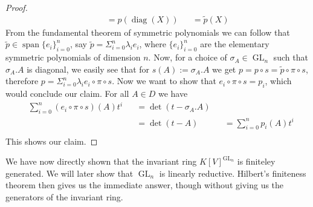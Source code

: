 \begin{proof}
\begin{equation}
\begin{aligned}
      &&&= p (\operatorname{diag}(X))&&= \tilde{p} (X)
    \end{aligned}
  \end{equation}
  From the fundamental theorem of symmetric polynomials we can follow that $\tilde{p} \in \operatorname{span}\{e_i\}_{i=0}^n$, say $\tilde{p} = \Sigma_{i=0}^n \lambda_i e_i$, where $\{ e_i \}_{i=0}^n$ are the elementary symmetric polynomials of dimension $n$.
  Now, for a choice of $\sigma_A \in \operatorname{GL}_n$ such that $\sigma_A . A$ is diagonal, we easily see that for $s(A) := \sigma_A . A$ we get $p = p \circ s = \tilde{p} \circ \pi \circ s$, therefore $p = \Sigma_{i=0}^n \lambda_i e_i \circ \pi \circ s$.
  Now we want to show that $e_i \circ \pi \circ s = p_i$, which would conclude our claim.
  For all $A\in D$ we have
  \begin{equation}
    \begin{aligned}
      &\sum_{i=0}^n (e_i \circ \pi \circ s)(A)t^i&&=\operatorname{det}(t-\sigma_A.A)\\
      &&&=\operatorname{det}(t-A)
      &&=\sum_{i=0}^n p_i(A)t^i\\
    \end{aligned}
  \end{equation}
  This shows our claim.
\end{proof}

  We have now directly shown that the invariant ring $K[V]^{\operatorname{GL}_n}$ is finiteley generated.
  We will later show that $\operatorname{GL}_n$ is linearly reductive.
  Hilbert's finiteness theorem then gives us the immediate answer, though without giving us the generators of the invariant ring.

